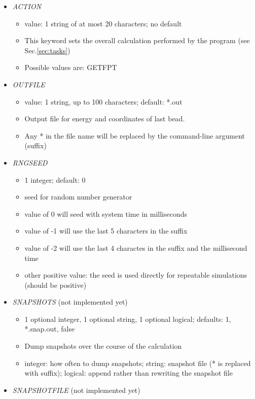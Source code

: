 \documentclass[12pt]{article}
\begin{document}
\begin{itemize}
%
\item {\it ACTION}
  \begin{itemize}
    \item  value: 1 string of at most 20 characters; no default
    \item This keyword sets the overall calculation performed by the program (see Sec.\ref{sec:tasks})
    \item Possible values are: GETFPT
  \end{itemize}
\item {\it OUTFILE}
    \begin{itemize}
      \item  value: 1 string, up to 100 characters; default: *.out
      \item Output file for energy and coordinates of last bead.
      \item Any * in the file name will be replaced by the command-line argument (suffix)  
      \end{itemize}
%    
\item {\it RNGSEED}
  \begin{itemize}
    \item 1 integer; default: 0
    \item seed for random number generator
    \item value of 0 will seed with system time in milliseconds
    \item value of -1 will use the last 5 characters in the suffix
    \item value of -2 will use the last 4 charactes in the suffix and the millisecond time
    \item other positive value: the seed is used directly for repeatable simulations (should be positive)
  \end{itemize}
%
\item {\it SNAPSHOTS} (not implemented yet)
  \begin{itemize}
    \item 1 optional integer, 1 optional string, 1 optional logical; defaults: 1, *.snap.out, false 
    \item Dump snapshots over the course of the calculation
    \item integer: how often to dump snapshots; string: snapshot file (* is replaced with suffix); logical: append rather than rewriting the snapshot file
   \end{itemize}
%
\item {\it SNAPSHOTFILE} (not implemented yet)

\end{itemize}
\end{document}
